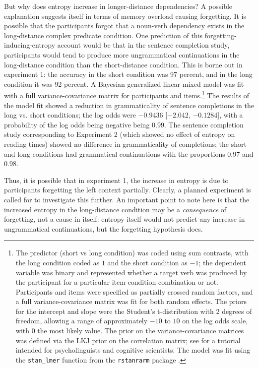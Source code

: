 \documentclass{frontiersSCNS}\usepackage{knitr} %
\begin{document}
But why does entropy increase in longer-distance dependencies? A possible explanation suggests itself in terms of memory overload causing forgetting. It is possible that the participants forgot that a noun-verb dependency exists in the long-distance complex predicate condition. One prediction of this forgetting-inducing-entropy
account would be that in the sentence completion study, participants would tend to produce more ungrammatical continuations in the long-distance condition than the short-distance condition. This is borne out in experiment 1: 
the accuracy in the short condition was 
97 percent, and in the long condition it was 92 percent. A Bayesian generalized linear mixed model was fit with a full variance-covariance matrix for participants and items.\footnote{The predictor (short vs long condition) was coded using sum contrasts, with the long condition coded as $1$ and the short condition as $-1$; the dependent variable was binary and represented whether a target verb was produced by the participant for a particular item-condition combination or not. Participants and items were specified as partially crossed random factors, and a full variance-covariance matrix was fit for both random effects. The priors for the intercept and slope were the Student's t-distribution with 2 degrees of freedom, allowing a range of approximately $-10$ to $10$ on the log odds scale, with 0 the most likely value. The prior on the variance-covariance matrices was defined via the LKJ prior \citep{stan-software:2013,stan-manual:2014} on the correlation matrix; see \citet{SorensenVasishthTutorial} for a tutorial intended for psycholinguists and cognitive scientists.  The model was fit using the \texttt{stan\_lmer} function from the  \texttt{rstanrarm} package \citep{rstanarm2016}.} 
The results of the model fit showed a reduction in grammaticality of sentence completions in the long vs. short conditions; the log odds were \ensuremath{-0.9436} [\ensuremath{-2.042}, \ensuremath{-0.1284}],
with a probability of the log odds being negative being 
0.99.
The sentence completion study corresponding to Experiment 2 (which showed no effect of entropy on reading times) showed no difference in grammaticality of completions; the short and long conditions had grammatical continuations with the proportions $0.97$ and $0.98$.

Thus, it is possible that in experiment 1, the increase in entropy is due to participants forgetting the left context partially.  Clearly, a planned experiment is called for to investigate this further. An important point to note here is that the increased entropy in the long-distance condition may be a \textit{consequence} of forgetting, not a cause in itself: entropy itself would not predict any increase in ungrammatical continuations, but the forgetting hypothesis does.
\end{document}
